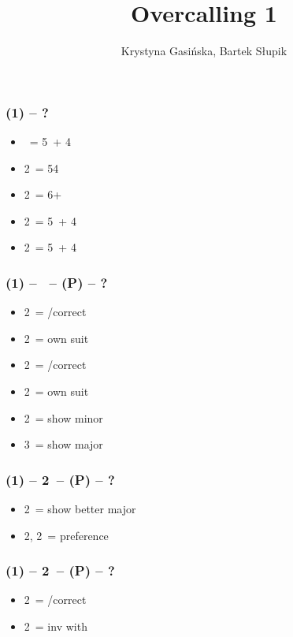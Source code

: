 \documentclass[12pt, a4paper]{article}
\title{Overcalling 1\ntx}
\author{Krystyna Gasińska, Bartek Słupik}
\begin{document}
\maketitle


\subsubsection*{(1\ntx) -- ?}
\begin{itemize}
    \item \dbl\ = 5\minor\ + 4\major
    \item 2\clubs\ = 54 \major
    \item 2\diams\ = 6+ \major
    \item 2\hearts\ = 5\hearts\ + 4\minor
    \item 2\spades\ = 5\spades\ + 4\minor
\end{itemize}

\subsubsection*{(1\ntx) -- \dbl\ -- (P) -- ?}
\begin{itemize}
    \item 2\clubs\ = \pass/correct
    \item 2\diams\ = own suit
    \item 2\hearts\ = \pass/correct
    \item 2\spades\ = own suit
    \item 2\nt\ = show minor
    \item 3\diams\ = show major
\end{itemize}

\subsubsection*{(1\ntx) -- 2\clubs\ -- (P) -- ?}
\begin{itemize}
    \item 2\diams\ = show better major
    \item 2\hearts, 2\spades\ = preference
\end{itemize}

\subsubsection*{(1\ntx) -- 2\diams\ -- (P) -- ?}
\begin{itemize}
    \item 2\hearts\ = \pass/correct
    \item 2\spades\ = inv with \hearts
\end{itemize}

\end{document}
